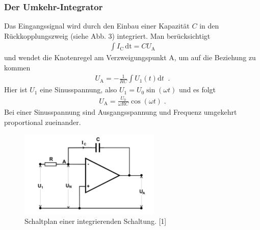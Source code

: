\documentclass{scrartcl}
\begin{document}
\subsubsection{Der Umkehr-Integrator}
Das Eingangssignal wird durch den Einbau einer Kapazität $C$ in den Rückkopplungszweig (siehe Abb. 3) integriert. Man berücksichtigt
\begin{align}
\int I_\text{C}\,\text{dt} = CU_\text{A}
\end{align}
 und wendet die Knotenregel am Verzweigungspunkt A, um auf die Beziehung zu kommen
\begin{align*}
U_\mathrm{A} = - \frac{1}{RC} \int U_1 (t) \mathrm{d}t \;\;.
\end{align*}
Hier ist $U_1$ eine Sinusspannung, also $U_1 = U_0 \sin (\omega t)$ und es folgt
\begin{align}
U_\mathrm{A} = \frac{U_0}{\omega RC} \cos (\omega t)\;.
\end{align}
Bei einer Sinusspannung sind Ausgangsspannung und Frequenz umgekehrt proportional zueinander.
\begin{figure}[!h]
\centering
\includegraphics[width=0.6\textwidth]{integrator}
\caption{Schaltplan einer integrierenden Schaltung. [1]}
\label{integrator}
\end{figure}

\newpage
\end{document}
